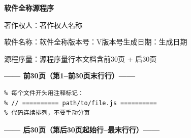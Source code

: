 \documentclass[a4paper,10pt]{article}
\begin{document}
\begin{center}
  {\LARGE\bfseries {{软件全称}}\quad 源程序}

  \vspace{0.5em}
  {\large 著作权人：{{著作权人名称}}}

  \vspace{0.3em}
  软件名称：{{软件全称}}\qquad 版本号：V{{版本号}}\qquad 生成日期：{{生成日期}}

  \vspace{0.3em}
  源程序量：{{源程序量}}行\qquad 本文档含前30页 + 后30页
\end{center}

\vspace{0.3em}

\begin{center}\large\bfseries —— 前30页（第1--{{前30页末行}}行）——\end{center}

\begin{Verbatim}[fontsize=\small]
% === 在此粘贴前30页的代码 ===
% 每个文件开头用注释标记：
% // ========== path/to/file.js ==========
% 代码连续排列，不要手动分页
\end{Verbatim}

\begin{center}\large\bfseries —— 后30页（第{{后30页起始行}}--{{最末行}}行）——\end{center}

\begin{Verbatim}[fontsize=\small]
% === 在此粘贴后30页的代码 ===
\end{Verbatim}
\end{document}
